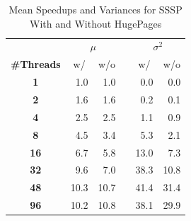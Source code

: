 \begin{table}
\renewcommand{\arraystretch}{1.3}
\centering
\caption{Mean Speedups and Variances for SSSP With and Without HugePages}
\label{tbl:ssspMeansVariances}
\begin{tabular}{c@{\hskip 2\tabcolsep}rrc@{\hskip 2\tabcolsep}rr}
\toprule
&\multicolumn{2}{c}{$\mu$}&\enspace&\multicolumn{2}{c}{$\sigma^2$}\\
\cmidrule(r){2-3}\cmidrule(r){5-6}
{\bf\#Threads}&\multicolumn{1}{c}{w/}&\multicolumn{1}{c}{w/o}&\enspace&\multicolumn{1}{c}{w/}&\multicolumn{1}{c}{w/o}\\\midrule
\bf1 & 1.0 & 1.0 &\enspace& 0.0 & 0.0 \\
\bf2 & 1.6 & 1.6 &\enspace& 0.2 & 0.1 \\
\bf4 & 2.5 & 2.5 &\enspace& 1.1 & 0.9 \\
\bf8 & 4.5 & 3.4 &\enspace& 5.3 & 2.1 \\
\bf16 & 6.7 & 5.8 &\enspace& 13.0 & 7.3 \\
\bf32 & 9.6 & 7.0 &\enspace& 38.3 & 10.8 \\
\bf48 & 10.3 & 10.7 &\enspace& 41.4 & 31.4 \\
\bf96 & 10.2 & 10.8 &\enspace& 38.1 & 29.9 \\
\bottomrule
\end{tabular}
\end{table}


